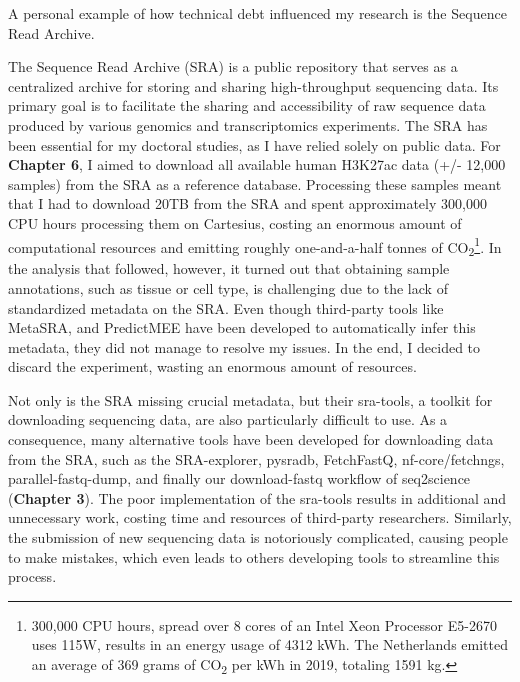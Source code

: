 \bigbreak
A personal example of how technical debt influenced my research is the Sequence Read Archive.

The Sequence Read Archive (SRA) is a public repository that serves as a centralized archive for storing and sharing high-throughput sequencing data. Its primary goal is to facilitate the sharing and accessibility of raw sequence data produced by various genomics and transcriptomics experiments. The SRA has been essential for my doctoral studies, as I have relied solely on public data. For \textbf{Chapter 6}, I aimed to download all available human H3K27ac data (+/- 12,000 samples) from the SRA as a reference database. Processing these samples meant that I had to download 20TB from the SRA and spent approximately 300,000 CPU hours processing them on Cartesius, costing an enormous amount of computational resources and emitting roughly one-and-a-half tonnes of CO\textsubscript{2}\footnote[2]{300,000 CPU hours, spread over 8 cores of an Intel Xeon Processor E5-2670 uses 115W\cite{intelIntelXeon}, results in an energy usage of 4312 kWh. The Netherlands emitted an average of 369 grams of CO\textsubscript{2} per kWh\cite{CO2} in 2019, totaling 1591 kg.}. In the analysis that followed, however, it turned out that obtaining sample annotations, such as tissue or cell type, is challenging due to the lack of standardized metadata on the SRA. Even though third-party tools like MetaSRA\cite{Bernstein2017}, and PredictMEE\cite{Klie2021} have been developed to automatically infer this metadata, they did not manage to resolve my issues. In the end, I decided to discard the experiment, wasting an enormous amount of resources.

Not only is the SRA missing crucial metadata, but their sra-tools, a toolkit for downloading sequencing data, are also particularly difficult to use. As a consequence, many alternative tools have been developed for downloading data from the SRA, such as the SRA-explorer\cite{sraexplorer}, pysradb\cite{pysradb}, FetchFastQ\cite{galvez2022metadata}, nf-core/fetchngs\cite{fetchngs}, parallel-fastq-dump\cite{parallelfastq}, and finally our download-fastq workflow of seq2science\cite{seq2science} (\textbf{Chapter 3}). The poor implementation of the sra-tools results in additional and unnecessary work, costing time and resources of third-party researchers. Similarly, the submission of new sequencing data is notoriously complicated, causing people to make mistakes, which even leads to others developing tools to streamline this process\cite{Quiones2020}. 


